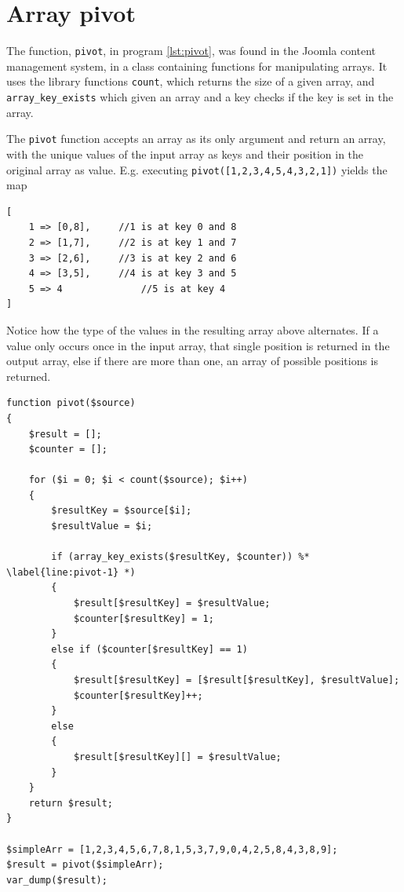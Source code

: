 \section{Array pivot}
The function, \texttt{pivot}, in program \ref{lst:pivot}, was found in the Joomla content management system, in a class containing functions for manipulating arrays. It uses the library functions \texttt{count}, which returns the size of a given array, and \texttt{array\_key\_exists} which given an array and a key checks if the key is set in the array. 

The \texttt{pivot} function accepts an array as its only argument and return an array, with the unique values of the input array as keys and their position in the original array as value. E.g. executing \texttt{pivot([1,2,3,4,5,4,3,2,1])} yields the map
\begin{lstlisting}[style=nonumbers]
[
	1 => [0,8], 	//1 is at key 0 and 8
	2 => [1,7], 	//2 is at key 1 and 7
	3 => [2,6], 	//3 is at key 2 and 6
	4 => [3,5], 	//4 is at key 3 and 5
	5 => 4  			//5 is at key 4
]
\end{lstlisting}
Notice how the type of the values in the resulting array above alternates. If a value only occurs once in the input array, that single position is returned in the output array, else  if there are more than one, an array of possible positions is returned.
\begin{program}
\begin{lstlisting}
function pivot($source)
{
    $result = [];
    $counter = [];

    for ($i = 0; $i < count($source); $i++)
    {
        $resultKey = $source[$i];
        $resultValue = $i;

        if (array_key_exists($resultKey, $counter)) %* \label{line:pivot-1} *)
        {
            $result[$resultKey] = $resultValue;
            $counter[$resultKey] = 1;
        }
        else if ($counter[$resultKey] == 1)
        {
            $result[$resultKey] = [$result[$resultKey], $resultValue];
            $counter[$resultKey]++;
        }
        else
        {
            $result[$resultKey][] = $resultValue;
        }
    }
    return $result;
}

$simpleArr = [1,2,3,4,5,6,7,8,1,5,3,7,9,0,4,2,5,8,4,3,8,9];
$result = pivot($simpleArr);
var_dump($result);
\end{lstlisting}
\caption{Pivot example}
\label{lst:pivot}
\end{program}

